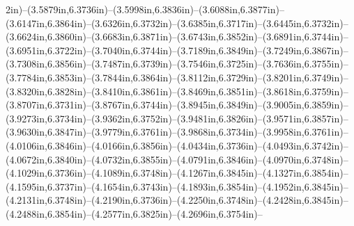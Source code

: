 2in)--(3.5879in,6.3736in)--(3.5998in,6.3836in)--(3.6088in,6.3877in)--(3.6147in,6.3864in)--(3.6326in,6.3732in)--(3.6385in,6.3717in)--(3.6445in,6.3732in)--(3.6624in,6.3860in)--(3.6683in,6.3871in)--(3.6743in,6.3852in)--(3.6891in,6.3744in)--(3.6951in,6.3722in)--(3.7040in,6.3744in)--(3.7189in,6.3849in)--(3.7249in,6.3867in)--(3.7308in,6.3856in)--(3.7487in,6.3739in)--(3.7546in,6.3725in)--(3.7636in,6.3755in)--(3.7784in,6.3853in)--(3.7844in,6.3864in)--(3.8112in,6.3729in)--(3.8201in,6.3749in)--(3.8320in,6.3828in)--(3.8410in,6.3861in)--(3.8469in,6.3851in)--(3.8618in,6.3759in)--(3.8707in,6.3731in)--(3.8767in,6.3744in)--(3.8945in,6.3849in)--(3.9005in,6.3859in)--(3.9273in,6.3734in)--(3.9362in,6.3752in)--(3.9481in,6.3826in)--(3.9571in,6.3857in)--(3.9630in,6.3847in)--(3.9779in,6.3761in)--(3.9868in,6.3734in)--(3.9958in,6.3761in)--(4.0106in,6.3846in)--(4.0166in,6.3856in)--(4.0434in,6.3736in)--(4.0493in,6.3742in)--(4.0672in,6.3840in)--(4.0732in,6.3855in)--(4.0791in,6.3846in)--(4.0970in,6.3748in)--(4.1029in,6.3736in)--(4.1089in,6.3748in)--(4.1267in,6.3845in)--(4.1327in,6.3854in)--(4.1595in,6.3737in)--(4.1654in,6.3743in)--(4.1893in,6.3854in)--(4.1952in,6.3845in)--(4.2131in,6.3748in)--(4.2190in,6.3736in)--(4.2250in,6.3748in)--(4.2428in,6.3845in)--(4.2488in,6.3854in)--(4.2577in,6.3825in)--(4.2696in,6.3754in)--
